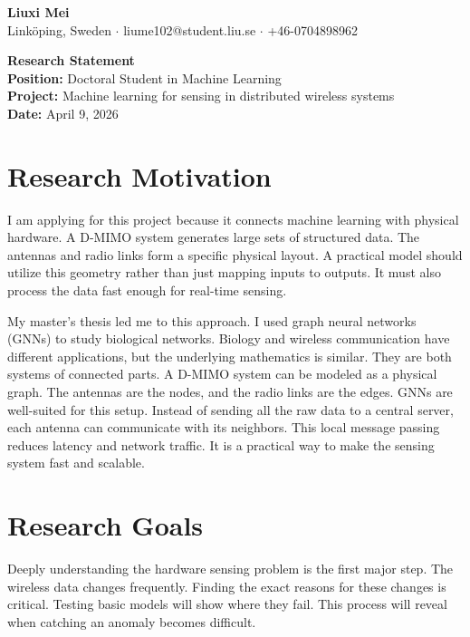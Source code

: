 \documentclass[11pt,a4paper]{article}
\begin{document}
\begin{center}
    {\LARGE \textbf{Liuxi Mei}} \\
    \vspace{2mm}
    Linköping, Sweden $\cdot$ liume102@student.liu.se $\cdot$ +46-0704898962
    \vspace{4mm}
\end{center}

\textbf{Research Statement} \\
\textbf{Position:} Doctoral Student in Machine Learning \\
\textbf{Project:} Machine learning for sensing in distributed wireless systems \\
\textbf{Date:} April 9, 2026

\section*{Research Motivation}

I am applying for this project because it connects machine learning with physical hardware. A D-MIMO system generates large sets of structured data. The antennas and radio links form a specific physical layout. A practical model should utilize this geometry rather than just mapping inputs to outputs. It must also process the data fast enough for real-time sensing.

My master's thesis led me to this approach. I used graph neural networks (GNNs) to study biological networks. Biology and wireless communication have different applications, but the underlying mathematics is similar. They are both systems of connected parts. A D-MIMO system can be modeled as a physical graph. The antennas are the nodes, and the radio links are the edges. GNNs are well-suited for this setup. Instead of sending all the raw data to a central server, each antenna can communicate with its neighbors. This local message passing reduces latency and network traffic. It is a practical way to make the sensing system fast and scalable.

\section*{Research Goals}

Deeply understanding the hardware sensing problem is the first major step. The wireless data changes frequently. Finding the exact reasons for these changes is critical. Testing basic models will show where they fail. This process will reveal when catching an anomaly becomes difficult.
\end{document}
